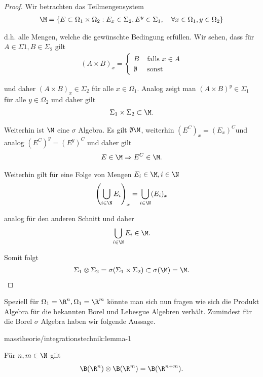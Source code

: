 \documentclass[letterpaper,10pt,german]{jupyterBook}
\begin{document}
\begin{proof}
 Wir betrachten das Teilmengensystem
\begin{align*}
\M = \{E\subset\Omega_1\times\Omega_2:  E_x\in\Sigma_2, E^y\in\Sigma_1,\quad\forall x\in\Omega_1,  y\in\Omega_2\}
\end{align*}
\par
d.h. alle Mengen, welche die gewünschte Bedingung erfüllen. Wir sehen, dass für \(A\in\Sigma1,B\in\Sigma_2\) gilt
\begin{align*}
(A\times B)_x = 
\begin{cases}
B &\text{ falls }x\in A\\
\emptyset &\text{ sonst}
\end{cases}
\end{align*}
\par
und daher \((A\times B)_x\in\Sigma_2\) für alle \(x\in\Omega_1\). Analog zeigt man \((A\times B)^y\in\Sigma_1\) für alle \(y\in\Omega_2\) und daher gilt
\begin{align*}
\Sigma_1\times\Sigma_2\subset \M.
\end{align*}
\par
Weiterhin ist \(\M\) eine \(\sigma\) Algebra. Es gilt \(\emptyset\M\), weiterhin \((E^C)_x = (E_x)^C\)und analog \((E^C)^y= (E^y)^C\) und daher
gilt
\begin{align*}
E\in\M\Rightarrow E^C\in\M.
\end{align*}
\par
Weiterhin gilt für eine Folge von Mengen \(E_i\in\M,i\in\N\)
\begin{align*}
\left(\bigcup_{i\in\N} E_i\right)_x = \bigcup_{i\in\N} (E_i)_x
\end{align*}
\par
analog für den anderen Schnitt und daher
\begin{align*}
\bigcup_{i\in\N} E_i\in\M.
\end{align*}
\par
Somit folgt
\begin{align*}
\Sigma_1\otimes\Sigma_2=\sigma(\Sigma_1\times\Sigma_2)\subset \sigma(\M) = \M.
\end{align*}\end{proof}

\par
Speziell für \(\Omega_1=\R^n, \Omega_1=\R^m\) könnte man sich nun fragen wie sich die Produkt Algebra für die bekannten Borel und Lebesgue Algebren verhält. Zumindest für die Borel \(\sigma\) Algebra haben wir folgende Aussage.
\begin{lemma}{}{masstheorie/integrationstechnik:lemma-1}



\par
Für \(n,m\in\N\) gilt
\begin{align*}
\B(\R^n)\otimes \B(\R^m) = \B(\R^{n+m}).
\end{align*}\end{lemma}
\end{document}
